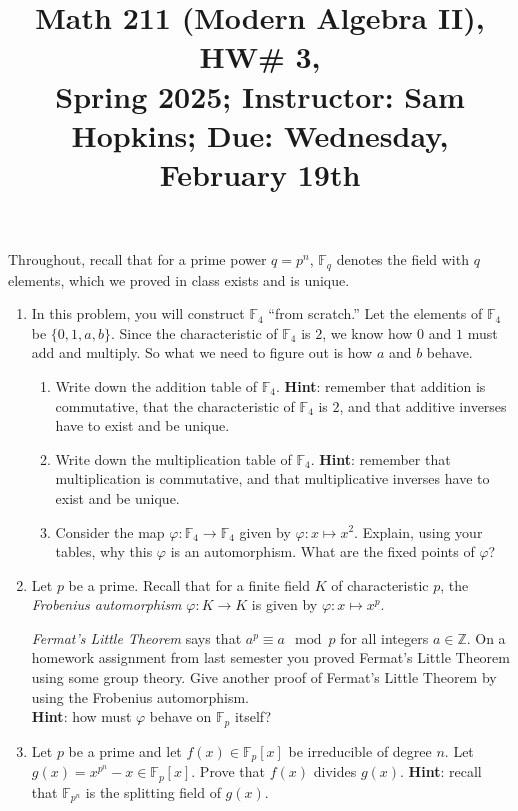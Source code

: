 \documentclass[11pt]{article}
\title{Math 211 (Modern Algebra II), HW\# 3, \\ {\normalsize Spring 2025; Instructor: Sam Hopkins; Due: Wednesday, February 19th}}
\date{}
\begin{document}
\maketitle

\thispagestyle{empty}

Throughout, recall that for a prime power $q=p^n$, $\mathbb{F}_q$ denotes the field with $q$ elements, which we proved in class exists and is unique.

\begin{enumerate}

\item In this problem, you will construct $\mathbb{F}_4$ ``from scratch.'' Let the elements of $\mathbb{F}_4$ be $\{0,1,a,b\}$. Since the characteristic of $\mathbb{F}_4$ is $2$, we know how $0$ and $1$ must add and multiply. So what we need to figure out is how $a$ and $b$ behave.
\begin{enumerate}
\item Write down the addition table of $\mathbb{F}_4$. {\bf Hint}: remember that addition is commutative, that the characteristic of $\mathbb{F}_4$ is $2$, and that additive inverses have to exist and be unique.
\item Write down the multiplication table of $\mathbb{F}_4$. {\bf Hint}: remember that multiplication is commutative, and that multiplicative inverses have to exist and be unique.
\item Consider the map $\varphi\colon \mathbb{F}_4 \to \mathbb{F}_4$ given by $\varphi\colon x \mapsto x^2$. Explain, using your tables, why this $\varphi$ is an automorphism. What are the fixed points of $\varphi$?
\end{enumerate}

\item Let $p$ be a prime. Recall that for a finite field $K$ of characteristic $p$, the \emph{Frobenius automorphism} $\varphi\colon K \to K$ is given by $\varphi\colon x \mapsto x^p$.

\emph{Fermat's Little Theorem} says that $a^p \equiv a \mod p$ for all integers $a\in\mathbb{Z}$. On a homework assignment from last semester you proved Fermat's Little Theorem using some group theory. Give another proof of Fermat's Little Theorem by using the Frobenius automorphism. \\{\bf Hint}: how must $\varphi$ behave on $\mathbb{F}_p$ itself?

\item Let $p$ be a prime and let $f(x) \in \mathbb{F}_p[x]$ be irreducible of degree $n$. Let $g(x) = x^{p^n}-x\in \mathbb{F}_p[x]$. Prove that $f(x)$ divides $g(x)$. {\bf Hint}: recall that $\mathbb{F}_{p^n}$ is the splitting field of $g(x)$.


\end{enumerate}
\end{document}
